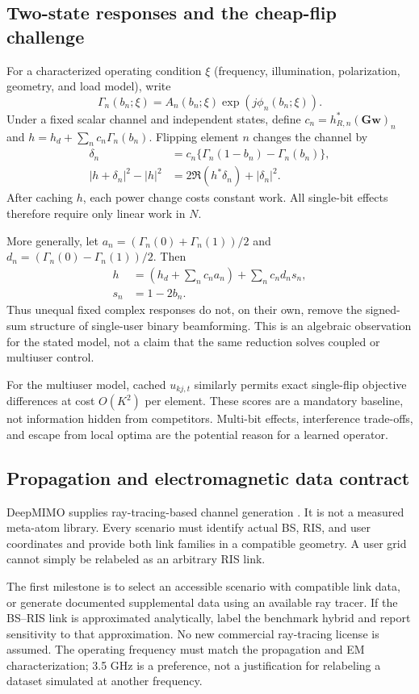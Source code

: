 \documentclass[conference]{IEEEtran}
\begin{document}
\subsection{Two-state responses and the cheap-flip challenge}
For a characterized operating condition $\xi$ (frequency, illumination, polarization, geometry, and load model), write
\[
\Gamma_n(b_n;\xi)=A_n(b_n;\xi)\exp\!\left(j\phi_n(b_n;\xi)\right).
\]
Under a fixed scalar channel and independent states, define $c_n=h_{R,n}^{*}(\mathbf G\mathbf w)_n$ and $h=h_d+\sum_n c_n\Gamma_n(b_n)$. Flipping element $n$ changes the channel by
\begin{align*}
\delta_n&=c_n\{\Gamma_n(1-b_n)-\Gamma_n(b_n)\},\\
|h+\delta_n|^2-|h|^2&=2\Re(h^*\delta_n)+|\delta_n|^2.
\end{align*}
After caching $h$, each power change costs constant work. All single-bit effects therefore require only linear work in $N$.

More generally, let $a_n=(\Gamma_n(0)+\Gamma_n(1))/2$ and
$d_n=(\Gamma_n(0)-\Gamma_n(1))/2$. Then
\begin{align*}
h&=\left(h_d+\sum_n c_na_n\right)+\sum_n c_nd_ns_n,\\
s_n&=1-2b_n.
\end{align*}
Thus unequal fixed complex responses do not, on their own, remove the signed-sum structure of single-user binary beamforming. This is an algebraic observation for the stated model, not a claim that the same reduction solves coupled or multiuser control.

For the multiuser model, cached $u_{kj,t}$ similarly permits exact single-flip objective differences at cost $O(K^2)$ per element. These scores are a mandatory baseline, not information hidden from competitors. Multi-bit effects, interference trade-offs, and escape from local optima are the potential reason for a learned operator.

\subsection{Propagation and electromagnetic data contract}
DeepMIMO supplies ray-tracing-based channel generation \cite{deepmimo}. It is not a measured meta-atom library. Every scenario must identify actual BS, RIS, and user coordinates and provide both link families in a compatible geometry. A user grid cannot simply be relabeled as an arbitrary RIS link.

The first milestone is to select an accessible scenario with compatible link data, or generate documented supplemental data using an available ray tracer. If the BS--RIS link is approximated analytically, label the benchmark hybrid and report sensitivity to that approximation. No new commercial ray-tracing license is assumed. The operating frequency must match the propagation and EM characterization; 3.5 GHz is a preference, not a justification for relabeling a dataset simulated at another frequency.
\end{document}
